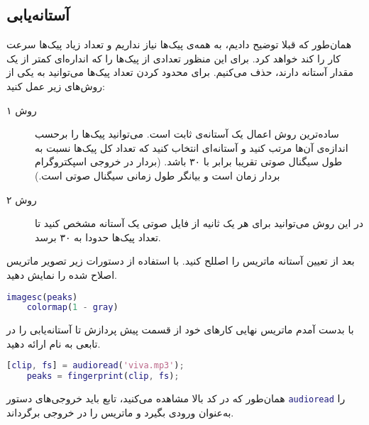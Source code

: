 \documentclass{utsignal}
\begin{document}
	\subsection{آستانه‌یابی}
	همان‌طور که قبلا توضیح دادیم، به همه‌ی پیک‌ها نیاز نداریم و تعداد زیاد پیک‌ها سرعت کار را کند خواهد کرد. برای این منظور تعدادی از پیک‌ها را که انداره‌ای کمتر از یک مقدار آستانه دارند، حذف می‌کنیم. برای محدود کردن تعداد پیک‌ها می‌توانید به یکی از روش‌های زیر عمل کنید:
	\begin{description}
		\item[روش ۱] 
		ساده‌ترین روش اعمال یک آستانه‌ی ثابت است. می‌توانید پیک‌ها را برحسب اندازه‌ی آن‌ها مرتب کنید و آستانه‌ای انتخاب کنید که تعداد کل پیک‌ها نسبت به طول سیگنال صوتی تقریبا برابر با ۳۰ باشد. (بردار  در خروجی اسپکتروگرام بردار زمان است و  بیانگر طول زمانی سیگنال صوتی است.)
		\item[روش ۲]
		در این روش می‌توانید برای هر یک ثانیه از فایل  صوتی یک آستانه مشخص کنید تا تعداد پیک‌ها حدودا به ۳۰ برسد.
	\end{description}
	بعد از تعیین آستانه ماتریس  را اصللح کنید. با استفاده از دستورات زیر تصویر ماتریس اصلاح شده  را نمایش دهید.
	\begin{latin}
		\begin{lstlisting}[language=Matlab]
	imagesc(peaks)
	colormap(1 - gray)\end{lstlisting}
	\end{latin}
	با بدست آمدم ماتریس نهایی  کار‌های خود از قسمت پیش پردازش تا آستانه‌یابی را در تابعی به نام  ارائه دهید. 
	\begin{latin}
		\begin{lstlisting}[language=Matlab]
	[clip, fs] = audioread('viva.mp3');
	peaks = fingerprint(clip, fs);\end{lstlisting}
	\end{latin}
	همان‌طور که در کد بالا مشاهده می‌کنید، تابع  باید خروجی‌های دستور \lstinline[language=Matlab]{audioread} را به‌عنوان ورودی بگیرد و ماتریس  را در خروجی برگرداند.
\end{document}
